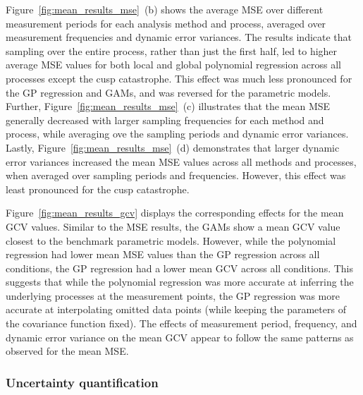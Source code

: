 \documentclass[man, floatsintext]{apa7}
\begin{document}
Figure~\ref{fig:mean_results_mse}~(b) shows the average MSE over different
measurement periods for each analysis method and process, averaged over
measurement frequencies and dynamic error variances. The results indicate that
sampling over the entire process, rather than just the first half, led to
higher average MSE values for both local and global polynomial regression
across all processes except the cusp catastrophe. This effect was much less
pronounced for the GP regression and GAMs, and was reversed for the parametric
models. Further, Figure~\ref{fig:mean_results_mse}~(c) illustrates that the
mean MSE generally decreased with larger sampling frequencies for each method
and process, while averaging ove the sampling periods and dynamic error
variances. Lastly, Figure~\ref{fig:mean_results_mse}~(d) demonstrates that
larger dynamic error variances increased the mean MSE values across all methods
and processes, when averaged over sampling periods and frequencies. However,
this effect was least pronounced for the cusp catastrophe.

Figure~\ref{fig:mean_results_gcv} displays the corresponding effects for the
mean GCV values. Similar to the MSE results, the GAMs show a mean GCV value
closest to the benchmark parametric models. However, while the polynomial
regression had lower mean MSE values than the GP regression across all
conditions, the GP regression had a lower mean GCV across all conditions. This
suggests that while the polynomial regression was more accurate at inferring
the underlying processes at the measurement points, the GP regression was more
accurate at interpolating omitted data points (while keeping the parameters of
the covariance function fixed). The effects of measurement period, frequency,
and dynamic error variance on the mean GCV appear to follow the same patterns
as observed for the mean MSE\@.

\begin{sidewaysfigure*}[htbp]
  \caption{Mean GCV effects}
  \label{fig:mean_results_gcv}
\end{sidewaysfigure*}

\subsubsection{Uncertainty quantification}
\end{document}
